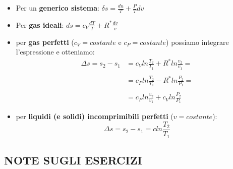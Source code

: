 \begin{itemize}
    \item Per un \textbf{generico sistema}: $\delta s = \frac{du}{T} + \frac{P}{T} dv$
    \item Per \textbf{gas ideali}: $ds = c_V \frac{dT}{T} + R^* \frac{dv}{v}$
    \item per \textbf{gas perfetti} ($c_V = costante$ e $c_P = costante$) possiamo integrare l'espressione e otteniamo: \newline
    \[
        \begin{matrix}
            \Delta s = s_2-s_1 &= c_V ln \frac{T_2}{T_1} + R^* ln \frac{v_2}{v_1} =\\
            \ \\
            &= c_P ln \frac{T_2}{T_1} - R^* ln \frac{P_2}{P_1} =\\
            \ \\
            &= c_P ln \frac{v_2}{v_1} + c_V ln \frac{P_2}{P_1}
        \end{matrix}
    \]
    \item per \textbf{liquidi (e solidi) incomprimibili perfetti} ($v = costante$): 
    \[
        \Delta s = s_2-s_1 = c ln \frac{T_2}{T_1}
    \]
\end{itemize}
\subsection{NOTE SUGLI ESERCIZI}